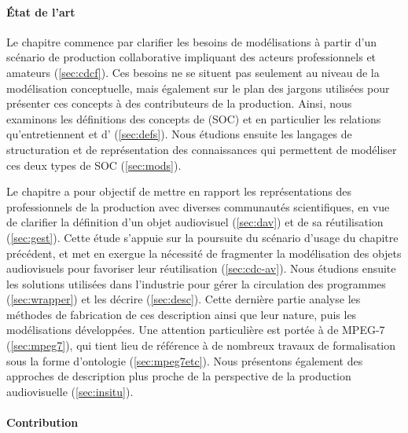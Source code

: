 \paragraph{État de l'art}

Le chapitre  commence par clarifier les besoins de modélisations à partir d'un scénario de production collaborative impliquant des acteurs professionnels et amateurs (\ref{sec:cdcf}).
Ces besoins ne se situent pas seulement au niveau de la modélisation conceptuelle, mais également sur le plan des jargons utilisées pour présenter ces concepts à des contributeurs de la production.
Ainsi, nous examinons les définitions des concepts de  (SOC) et en particulier les relations qu'entretiennent  et d' (\ref{sec:defs}).
Nous étudions ensuite les langages de structuration et de représentation des connaissances qui permettent de modéliser ces deux types de SOC (\ref{sec:mods}).

Le chapitre  a pour objectif de mettre en rapport les représentations des professionnels de la production avec diverses communautés scientifiques, en vue de clarifier la définition d'un objet audiovisuel (\ref{sec:dav}) et de sa réutilisation (\ref{sec:gest}).
Cette étude s'appuie sur la poursuite du scénario d'usage du chapitre précédent, et met en exergue la nécessité de fragmenter la modélisation des objets audiovisuels pour favoriser leur réutilisation (\ref{sec:cdc-av}).
Nous étudions ensuite les solutions utilisées dans l'industrie pour gérer la circulation des programmes (\ref{sec:wrapper}) et les décrire (\ref{sec:desc}).
Cette dernière partie analyse les méthodes de fabrication de ces description ainsi que leur nature, puis les modélisations développées.
Une attention particulière est portée à de MPEG-7 (\ref{sec:mpeg7}), qui tient lieu de référence à de nombreux travaux de formalisation sous la forme d'ontologie (\ref{sec:mpeg7etc}).
Nous présentons également des approches de description plus proche de la perspective de la production audiovisuelle (\ref{sec:insitu}).


\paragraph{Contribution}

